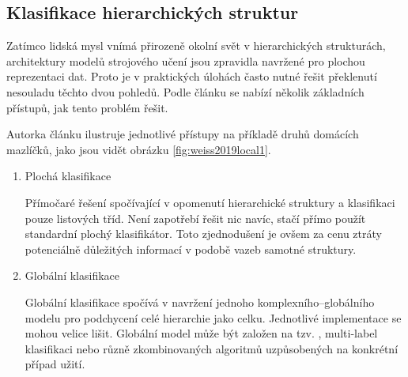 \documentclass[thesis=M,czech]{FITthesis}[2019/12/23]
\begin{document}
\subsection{Klasifikace hierarchických struktur}
\label{sec:hierarchy_classification}

Zatímco lidská mysl vnímá přirozeně okolní svět v hierarchických strukturách, architektury modelů strojového učení jsou zpravidla navržené pro plochou reprezentaci dat. Proto je v praktických úlohách často nutné řešit překlenutí nesouladu těchto dvou pohledů. Podle článku\cite{weiss2019} se nabízí několik základních přístupů, jak tento problém řešit.

Autorka článku ilustruje jednotlivé přístupy na příkladě druhů domácích mazlíčků, jako jsou vidět obrázku \ref{fig:weiss2019local1}.

\begin{enumerate}
    \item Plochá klasifikace
    
    Přímočaré řešení spočívající v opomenutí hierarchické struktury a klasifikaci pouze listových tříd. Není zapotřebí řešit nic navíc, stačí přímo použít standardní plochý klasifikátor. Toto zjednodušení je ovšem za cenu ztráty potenciálně důležitých informací v podobě vazeb samotné struktury.
    
    

    \item Globální klasifikace
    
    Globální klasifikace spočívá v navržení jednoho komplexního--globálního modelu pro podchycení celé hierarchie jako celku. Jednotlivé implementace se mohou velice lišit. Globální model může být založen na tzv. , multi-label klasifikaci nebo různě zkombinovaných algoritmů uzpůsobených na konkrétní případ užití.
    
    

\end{enumerate}
\end{document}
